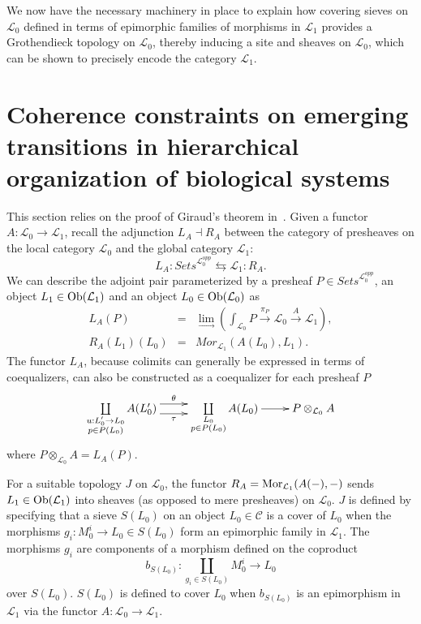 \documentclass[aps,twocolumn]{revtex4-1}
\begin{document}
We now have the necessary machinery in place to explain how covering sieves on $\mathcal{L}_0$ defined in terms of epimorphic families of morphisms in $\mathcal{L}_1$ provides a Grothendieck topology on $\mathcal{L}_0$, thereby inducing a site and sheaves on $\mathcal{L}_0$, which can be shown to precisely encode the category $\mathcal{L}_1$.

\section{Coherence constraints on emerging transitions in hierarchical organization of biological systems}

This section relies on the proof of Giraud's theorem in~\cite{MacLane1992}. Given a functor $A: \mathcal{L}_0 \rightarrow \mathcal{L}_1$, recall the adjunction $L_A \dashv R_A$ between the category of presheaves on the local category $\mathcal{L}_0$ and the global category $\mathcal{L}_1$:
$$
L_A: \textit{Sets}^{\mathcal{L}_0^{opp}} \leftrightarrows \mathcal{L}_1 :R_A.
$$
We can describe the adjoint pair parameterized by a presheaf $P \in \textit{Sets}^{\mathcal{L}_0^{opp}}$, an object $L_1 \in \mathop{\rm Ob}\nolimits(\mathcal{L}_1)$ and an object $L_0 \in \mathop{\rm Ob}\nolimits(\mathcal{L}_0)$ as
\begin{eqnarray*}
L_A(P) &=& \lim\limits_{\longrightarrow} \left( \int_{\mathcal{L}_0} P \xrightarrow{\pi_P} \mathcal{L}_0 \xrightarrow{A} \mathcal{L}_1 \right),\\
R_A(L_1)(L_0) &=& Mor_{\mathcal{L}_1}(A(L_0),L_1).
\end{eqnarray*}
The functor $L_A$, because colimits can generally be expressed in terms of coequalizers, can also be constructed as a coequalizer for each presheaf $P$
\begin{displaymath}
\xymatrix{
\coprod\limits_{\substack{u : L'_0 \rightarrow L_0 \\ p \in P(L_0)}}
A(L'_0)
\ar@<1ex>[r]^-{\theta} \ar@<-1ex>[r]_-{\tau}
&
\coprod\limits_{\substack{L_0 \\ p \in P(L_0)}}
A(L_0)
\ar[r]
&
P \otimes_{\mathcal{L}_0} A
}
\end{displaymath}
where $P \otimes_{\mathcal{L}_0} A = L_A(P)$.

For a suitable topology $J$ on $\mathcal{L}_0$, the functor $R_A = \mathop{\rm Mor}\nolimits_{\mathcal{L}_1}(A(-),-)$ sends $L_1 \in \mathop{\rm Ob}\nolimits(\mathcal{L}_1)$ into sheaves (as opposed to mere presheaves) on $\mathcal{L}_0$. $J$ is defined by specifying that a sieve $S(L_0)$ on an object $L_0 \in \mathcal{C}$ is a cover of $L_0$ when the morphisms $g_i : M_0^i \rightarrow L_0 \in S(L_0)$ form an epimorphic family in $\mathcal{L}_1$. The morphisms $g_i$ are components of a morphism defined on the coproduct
$$
b_{S(L_0)} : \coprod\limits_{g_i \in S(L_0)} M_0^i \longrightarrow L_0
$$
over $S(L_0)$. $S(L_0)$ is defined to cover $L_0$ when $b_{S(L_0)}$ is an epimorphism in $\mathcal{L}_1$ via the functor $A:\mathcal{L}_0 \rightarrow \mathcal{L}_1$.
\end{document}
